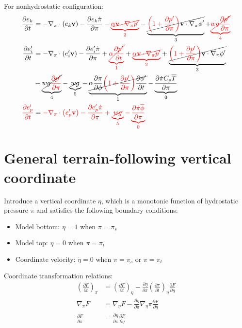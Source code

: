 \documentclass[12pt]{article}
\newcommand{\pd}[2]{\frac{\partial #1}{\partial #2}}
\newcommand{\pdt}[1]{\pd{#1}{t}}
\newcommand{\pdz}[1]{\pd{#1}{\pi}}
\renewcommand{\vec}[1]{\mathbf{#1}}
\newcommand{\grad}[2][\pi]{\nabla_{#1} #2}
\begin{document}
For nonhydrostatic configuration:
\begin{align*}
  \pdt{e_k} & = - \nabla_\pi \cdot \left(e_k \vec{v}\right) - \pdz{e_k \dot{\pi}} - {\color{red}\underbrace{\cancel{\alpha \vec{v} \cdot \nabla_\pi p^\prime}}_2} - \underbrace{\cancel{{\color{red}\left(1 + \pd{p^\prime}{\pi}\right)} \vec{v} \cdot \nabla_\pi \phi^\prime}}_3 + {\color{red}\underbrace{\cancel{w g \pd{p^\prime}{\pi}}}_4} \\
  \pdt{e_i^\prime} & = - \nabla_\pi \cdot \left(e_i^\prime \vec{v}\right) - \pdz{e_i^\prime \dot{\pi}} + {\color{red}\underbrace{\cancel{\alpha \pdt{p^\prime}}}_1} + {\color{red}\underbrace{\cancel{\alpha \vec{v} \cdot \nabla_\pi p^\prime}}_2} + \underbrace{\cancel{{\color{red}\left(1 + \pd{p^\prime}{\pi}\right)} \vec{v} \cdot \nabla_\pi \phi^\prime}}_3 \\
  & - \underbrace{\cancel{w g {\color{red}\pd{p^\prime}{\pi}}}}_4 - \underbrace{\cancel{w g}}_5 - \underbrace{\cancel{\alpha \pd{\pi}{\phi} {\color{red}\left(1 + \pd{p^\prime}{\pi}\right)} \pdt{\phi^\prime}}}_1 - \underbrace{\pd{\dot{\pi} C_p \overline{T}}{\pi}}_0 \\
  {\color{red}\pdt{e_p^\prime}} & = {\color{red}- \nabla_\pi \cdot \left(e_p^\prime \vec{v}\right) - \pdz{e_p^\prime \dot{\pi}} + \underbrace{\cancel{w g}}_5 - \underbrace{\pd{\dot{\pi} \overline{\phi}}{\pi}}_0}
\end{align*}

\section{General terrain-following vertical coordinate}

Introduce a vertical coordinate $\eta$, which is a monotonic function of hydrostatic pressure $\pi$ and satisfies the following boundary conditions:
\begin{itemize}
  \item Model bottom: $\eta = 1$ when $\pi = \pi_s$
  \item Model top: $\eta = 0$ when $\pi = \pi_t$
  \item Coordinate velocity: $\dot{\eta} = 0$ when $\pi = \pi_s$ or $\pi = \pi_t$
\end{itemize}
Coordinate transformation relations:
\begin{align*}
  \left(\pdt{F}\right)_\pi & = \left(\pdt{F}\right)_\eta - \pd{\eta}{\pi} \left(\pdt{\pi}\right)_\eta \pd{F}{\eta} \\
  \grad{F} & = \grad[\eta]{F} - \pd{\eta}{\pi} \grad[\eta]{\pi} \pd{F}{\eta} \\
  \pd{F}{\pi} & = \pd{\eta}{\pi} \pd{F}{\eta}
\end{align*}
\end{document}
